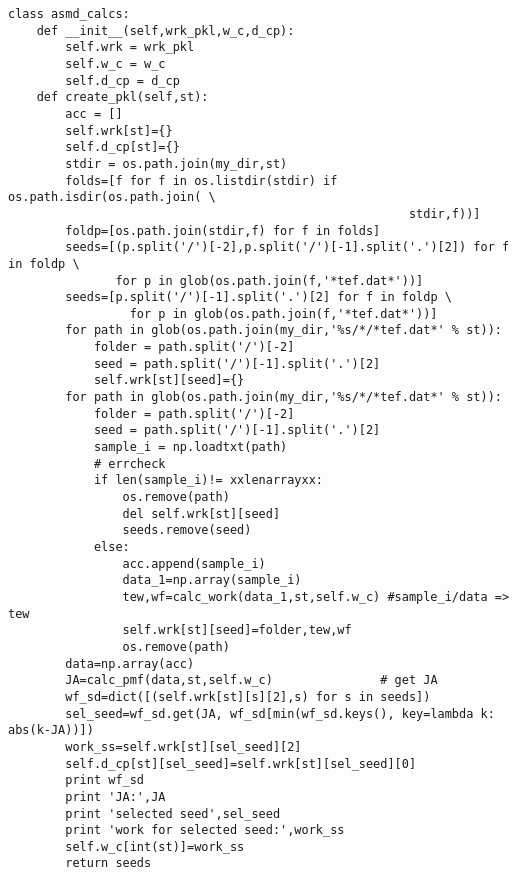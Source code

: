 \documentclass[11pt]{article}
\begin{document}
\begin{verbatim}
class asmd_calcs:
    def __init__(self,wrk_pkl,w_c,d_cp):
        self.wrk = wrk_pkl
        self.w_c = w_c
        self.d_cp = d_cp
    def create_pkl(self,st):
        acc = []
        self.wrk[st]={}
        self.d_cp[st]={}
        stdir = os.path.join(my_dir,st)
        folds=[f for f in os.listdir(stdir) if os.path.isdir(os.path.join( \
                                                        stdir,f))]
        foldp=[os.path.join(stdir,f) for f in folds]
        seeds=[(p.split('/')[-2],p.split('/')[-1].split('.')[2]) for f in foldp \
               for p in glob(os.path.join(f,'*tef.dat*'))]
        seeds=[p.split('/')[-1].split('.')[2] for f in foldp \
                 for p in glob(os.path.join(f,'*tef.dat*'))]
        for path in glob(os.path.join(my_dir,'%s/*/*tef.dat*' % st)):
            folder = path.split('/')[-2]
            seed = path.split('/')[-1].split('.')[2]
            self.wrk[st][seed]={}
        for path in glob(os.path.join(my_dir,'%s/*/*tef.dat*' % st)):
            folder = path.split('/')[-2]
            seed = path.split('/')[-1].split('.')[2]
            sample_i = np.loadtxt(path)
            # errcheck
            if len(sample_i)!= xxlenarrayxx:
                os.remove(path)
                del self.wrk[st][seed]
                seeds.remove(seed)
            else:
                acc.append(sample_i)
                data_1=np.array(sample_i)
                tew,wf=calc_work(data_1,st,self.w_c) #sample_i/data => tew
                self.wrk[st][seed]=folder,tew,wf
                os.remove(path)
        data=np.array(acc)
        JA=calc_pmf(data,st,self.w_c)               # get JA
        wf_sd=dict([(self.wrk[st][s][2],s) for s in seeds])
        sel_seed=wf_sd.get(JA, wf_sd[min(wf_sd.keys(), key=lambda k: abs(k-JA))])
        work_ss=self.wrk[st][sel_seed][2]
        self.d_cp[st][sel_seed]=self.wrk[st][sel_seed][0]
        print wf_sd
        print 'JA:',JA
        print 'selected seed',sel_seed
        print 'work for selected seed:',work_ss
        self.w_c[int(st)]=work_ss
        return seeds
\end{verbatim}
\end{document}
